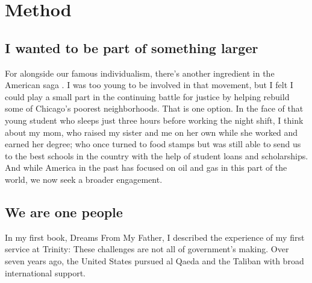 \section{Method} \label{sec_method}

\subsection{I wanted to be part of something larger}

For alongside our famous individualism, there's another ingredient in the American saga \citep{bessell2005standard}. I was too young to be involved in that movement, but I felt I could play a small part in the continuing battle for justice by helping rebuild some of Chicago's poorest neighborhoods. That is one option. In the face of that young student who sleeps just three hours before working the night shift, I think about my mom, who raised my sister and me on her own while she worked and earned her degree; who once turned to food stamps but was still able to send us to the best schools in the country with the help of student loans and scholarships. And while America in the past has focused on oil and gas in this part of the world, we now seek a broader engagement.

\subsection{We are one people}

In my first book, Dreams From My Father, I described the experience of my first service at Trinity: These challenges are not all of government's making. Over seven years ago, the United States pursued al Qaeda and the Taliban with broad international support.
